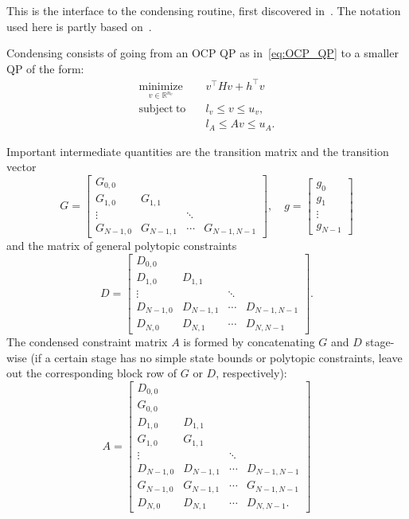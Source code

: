 \documentclass{report}
\begin{document}
This is the interface to the condensing routine, first discovered in~\cite{Bock1984}. The notation used here is partly based on~\cite{Frasch2014a}.

Condensing consists of going from an OCP QP as in~\eqref{eq:OCP_QP} to a smaller QP of the form:
\begin{subequations}
	\label{eq:condensed_QP}
	\begin{alignat}{3}
	\underset{v \in \mathbb{R}^{n_v}}{\mathrm{minimize}} \quad & v^\top H v + h^\top v \\
	\mathrm{subject~to} \quad & l_v \leq v \leq u_v, \\
	& l_A \leq A v \leq u_A.
	\end{alignat}
\end{subequations}

Important intermediate quantities are the transition matrix and the transition vector
\begin{equation}
G = \begin{bmatrix}
G_{0,0} \\
G_{1,0} & G_{1,1} \\
\vdots & & \ddots \\
G_{N-1,0} & G_{N-1,1} & \cdots & G_{N-1,N-1}
\end{bmatrix}, \quad g = \begin{bmatrix}
g_0 \\
g_1 \\
\vdots \\
g_{N-1}
\end{bmatrix}
\end{equation}
and the matrix of general polytopic constraints
\begin{equation}
D = \begin{bmatrix}
D_{0,0} \\
D_{1,0} & D_{1,1} \\
\vdots & & \ddots \\
D_{N-1,0} & D_{N-1,1} & \cdots & D_{N-1,N-1} \\
D_{N,0} & D_{N,1} & \cdots & D_{N,N-1}
\end{bmatrix}.
\end{equation}
The condensed constraint matrix $A$ is formed by concatenating $G$ and $D$ stage-wise (if a certain stage has no simple state bounds or polytopic constraints, leave out the corresponding block row of $G$ or $D$, respectively):
\begin{equation}
A = \begin{bmatrix}
D_{0,0} \\
G_{0,0} \\
D_{1,0} & D_{1,1} \\
G_{1,0} & G_{1,1} \\
\vdots & & \ddots \\
D_{N-1,0} & D_{N-1,1} & \cdots & D_{N-1,N-1} \\
G_{N-1,0} & G_{N-1,1} & \cdots & G_{N-1,N-1} \\
D_{N,0} & D_{N,1} & \cdots & D_{N,N-1}.
\end{bmatrix}
\end{equation}
\end{document}
